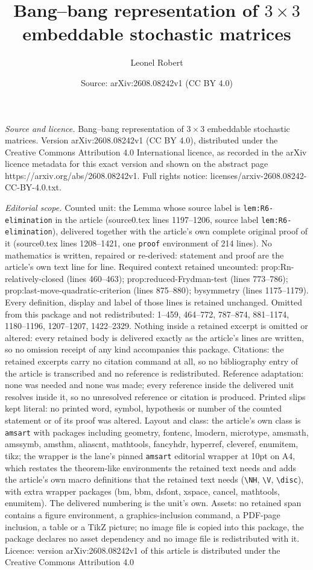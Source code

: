 \documentclass[10pt,a4paper]{amsart}
\title[Bang--bang representation of $3\times 3$ embeddable stochast]{Bang--bang representation of $3\times 3$ embeddable stochastic matrices}
\author{Leonel Robert}
\date{Source: arXiv:2608.08242v1 (CC BY 4.0)}
\begin{document}
\maketitle

\noindent\emph{Source and licence.} Bang--bang representation of $3\times 3$ embeddable stochastic matrices. Version arXiv:2608.08242v1 (CC BY 4.0), distributed under the Creative Commons Attribution 4.0 International licence, as recorded in the arXiv licence metadata for this exact version and shown on the abstract page https://arxiv.org/abs/2608.08242v1. Full rights notice: licenses/arxiv-2608.08242-CC-BY-4.0.txt.\par\smallskip

\noindent\textit{Editorial scope.} Counted unit: the Lemma whose source label is \texttt{lem:R6-elimination} in the article (source0.tex lines 1197--1206, source label \texttt{lem:R6-elimination}), delivered together with the article's own complete original proof of it (source0.tex lines 1208--1421, one \texttt{proof} environment of 214 lines). No mathematics is written, repaired or re-derived: statement and proof are the article's own text line for line. Required context retained uncounted: prop:Rn-relatively-closed (lines 460--463); prop:reduced-Frydman-test (lines 773--786); prop:last-move-quadratic-criterion (lines 875--880); bysymmetry (lines 1175--1179). Every definition, display and label of those lines is retained unchanged. Omitted from this package and not redistributed: 1--459, 464--772, 787--874, 881--1174, 1180--1196, 1207--1207, 1422--2329. Nothing inside a retained excerpt is omitted or altered: every retained body is delivered exactly as the article's lines are written, so no omission receipt of any kind accompanies this package. Citations: the retained excerpts carry no citation command at all, so no bibliography entry of the article is transcribed and no reference is redistributed. Reference adaptation: none was needed and none was made; every reference inside the delivered unit resolves inside it, so no unresolved reference or citation is produced. Printed slips kept literal: no printed word, symbol, hypothesis or number of the counted statement or of its proof was altered. Layout and class: the article's own class is \texttt{amsart} with packages including geometry, fontenc, lmodern, microtype, amsmath, amssymb, amsthm, aliascnt, mathtools, fancyhdr, hyperref, cleveref, enumitem, tikz; the wrapper is the lane's pinned \texttt{amsart} editorial wrapper at 10pt on A4, which restates the theorem-like environments the retained text needs and adds the article's own macro definitions that the retained text needs (\texttt{\textbackslash NH}, \texttt{\textbackslash V}, \texttt{\textbackslash disc}), with extra wrapper packages (bm, bbm, dsfont, xspace, cancel, mathtools, enumitem). The delivered numbering is the unit's own. Assets: no retained span contains a figure environment, a graphics-inclusion command, a PDF-page inclusion, a table or a TikZ picture; no image file is copied into this package, the package declares no asset dependency and no image file is redistributed with it. Licence: version arXiv:2608.08242v1 of this article is distributed under the Creative Commons Attribution 4.0 
\end{document}
